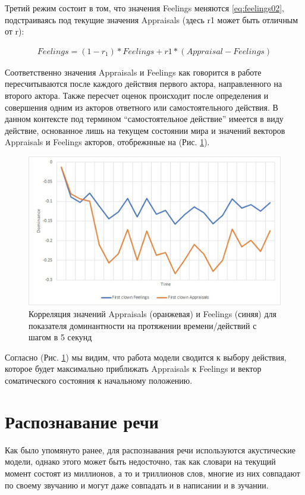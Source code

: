 Третий режим состоит в том, что значения Feelings меняются \ref{eq:feelings02}, подстраиваясь под текущие значения Appraisals (здесь r1 может быть отличным от r): 

\begin{equation}
  \begin{gathered}
    Feelings=(1-r_1 )*Feelings+r1*(Appraisal-Feelings)
  \end{gathered}
  \label{eq:feelings02}
\end{equation}

Соответственно значения Appraisals и Feelings как говорится в работе \cite{Samsonovich05} пересчитываются после каждого действия первого актора, направленного на второго актора.
Также пересчет оценок происходит после определения и совершения одним из акторов ответного или самостоятельного действия. 
В данном контексте под термином “самостоятельное действие” имеется в виду действие, основанное лишь на текущем состоянии мира и 
значений векторов Appraisals и Feelings акторов, отобрежнные на (Рис. \ref{pic:ris8}). 


\begin{figure}[h]
\includegraphics[width=0.75\columnwidth]{./img/ris8.png}
\centering
\caption{Корреляция значений Appraisals (оранжевая) и Feelings (синяя) для показателя доминантности на протяжении времени/действий с шагом в 5 секунд}
\label{pic:ris8}
\end{figure}

Согласно (Рис. \ref{pic:ris8}) мы видим, что работа модели сводится к выбору действия, 
которое будет максимально приближать Appraisals к Feelings и вектор соматического состояния к начальному положению.

\section{Распознавание речи}

Как было упомянуто ранее, для распознавания речи используются акустические модели, однако этого 
может быть недосточно, так как словари на текущий момент состоят из 
миллионов, а то и триллионов слов, многие из них совпадают по своему звучанию и могут даже совпадать и в написании и в зучании.

